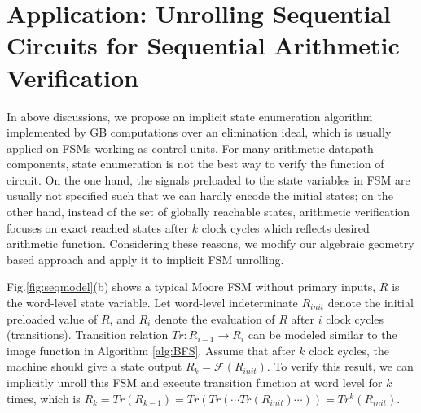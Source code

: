 \section{Application: Unrolling Sequential Circuits for Sequential Arithmetic Verification}
In above discussions, we propose an implicit state enumeration algorithm implemented by GB computations over
an elimination ideal, which is usually applied on FSMs working as control units. For many arithmetic
datapath components, state enumeration is not the best way to verify the function of circuit. On the one hand, the signals preloaded
to the state variables in FSM are usually not specified such that we can hardly encode the initial states; on the other
hand, instead of the set of globally reachable states, arithmetic verification focuses on exact reached states
after $k$ clock cycles which reflects desired arithmetic function. Considering these reasons, we modify
our algebraic geometry based approach and apply it to implicit FSM unrolling. 



Fig.\ref{fig:seqmodel}(b) shows a typical Moore FSM without primary inputs, $R$ is the word-level state variable. Let word-level indeterminate 
$R_{init}$ denote the initial preloaded value of $R$, and $R_{i}$ denote the evaluation of $R$ after $i$ clock cycles
(transitions). Transition relation $Tr:R_{i-1}\to R_i$ can be modeled similar to
the image function in Algorithm \ref{alg:BFS}. Assume that after $k$ clock cycles, the machine should give a state output
$R_{k} = \mathcal F(R_{init})$. To verify this result, we can implicitly unroll this FSM and execute transition
function at word level for $k$ times, which is $R_{k} = Tr(R_{k-1}) = Tr(Tr(\cdots Tr(R_{init})\cdots)) = Tr^k(R_{init})$.

